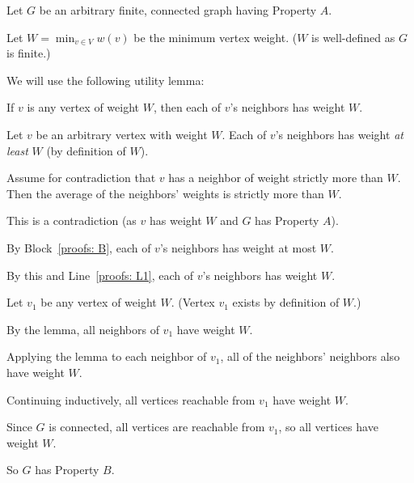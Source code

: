 \begin{longFormProof}
  \step Let $G$ be an arbitrary finite, connected graph having Property $A$.

  \step Let $W = \min_{v\in V} w(v)$ be the minimum vertex weight.  ($W$ is well-defined as $G$ is finite.)

  \smallskip
  
  We will use the following utility lemma:
  
  \begin{lemma}\label{proofs: lemma: all}
    If $v$ is any vertex of weight $W$,
    then each of $v$'s neighbors has weight $W$.
  \end{lemma}
  \begin{longFormSubProof}
    \step Let $v$ be an arbitrary vertex with weight $W$.
    \step[proofs: L1] Each of $v$'s neighbors has weight \emph{at least} $W$ (by definition of $W$).
    \begin{block}[proofs: B]
      \step Assume for contradiction that $v$ has a neighbor of weight strictly more than $W$.
      \step Then the average of the neighbors' weights is strictly more than $W$.

      \step This is a contradiction (as $v$ has weight $W$ and $G$ has Property $A$).
    \end{block}
    \step By Block~\ref{proofs: B}, each of $v$'s neighbors has weight at most $W$.

    \step By this and Line~\ref{proofs: L1}, each of $v$'s neighbors has weight $W$.
    \vspace*{-1em}
  \end{longFormSubProof}
  
  \step Let $v_1$ be any vertex of weight $W$.  (Vertex $v_1$ exists by definition of $W$.)

  \step By the lemma, all neighbors of $v_1$ have weight $W$.

  \step Applying the lemma to each neighbor of $v_1$,
  all of the neighbors' neighbors also have weight $W$.

  \step Continuing inductively, all vertices reachable from $v_1$ have weight $W$.

  \step Since $G$ is connected, all vertices are reachable from $v_1$,
  so all vertices have weight $W$.

  \step So $G$ has Property $B$.
\end{longFormProof}


